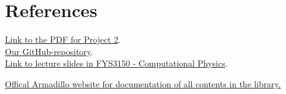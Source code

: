 \documentclass{article}
\begin{document}
\section{References} \label{sec:References}

\href{https://github.com/CompPhysics/ComputationalPhysics/blob/master/doc/Projects/2019/Project2/pdf/Project2.pdf}{Link to the PDF for Project 2}. \\

\href{https://github.com/Erikbgram/Fys3150}{Our GitHub-repository}. \\

\href{https://github.com/CompPhysics/ComputationalPhysics/blob/master/doc/Lectures/lectures2015.pdf}{Link to lecture slides in FYS3150 - Computational Physics}.

\href{http://arma.sourceforge.net/docs.html#eig_sym}{Offical Armadillo website for documentation of all contents in the library.}









\end{document}
